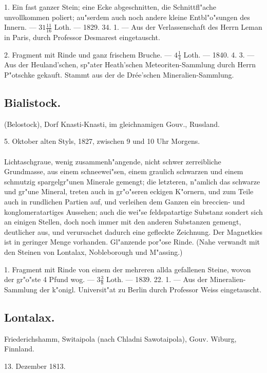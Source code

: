 \documentclass[a4paper, 11pt, oneside, polutonikogreek, german]{article}
\begin{document}
1. Ein fast ganzer Stein; eine Ecke abgeschnitten, die Schnittfl"ache unvollkommen poliert; au"serdem auch noch andere kleine Entbl"o"sungen des Innern. --- $31\frac{11}{16}$ Loth. --- 1829. 34. 1. --- Aus der Verlassenschaft des Herrn Leman in Paris, durch Professor Desmarest eingetauscht.

2. Fragment mit Rinde und ganz frischem Bruche. --- $4\frac{1}{4}$ Loth. --- 1840. 4. 3. --- Aus der Heuland'schen, sp"ater Heath'schen Meteoriten-Sammlung durch Herrn P"otschke gekauft. Stammt aus der de Drée'schen Mineralien-Sammlung.
\subsection{Bialistock.}
\begin{center}
\small
(Belostock), Dorf Knasti-Knasti, im gleichnamigen Gouv., Russland.

5. Oktober alten Styls, 1827, zwischen 9 und 10 Uhr Morgens.
\end{center}
\paragraph{}
Lichtaschgraue, wenig zusammenh"angende, nicht schwer zerreibliche Grundmasse, aus einem schneewei"sen, einem graulich schwarzen und einem schmutzig spargelgr"unen Minerale gemengt; die letzteren, n"amlich das schwarze und gr"une Mineral, treten auch in gr"o"seren eckigen K"ornern, und zum Teile auch in rundlichen Partien auf, und verleihen dem Ganzen ein breccien- und konglomeratartiges Aussehen; auch die wei"se feldspatartige Substanz sondert sich an einigen Stellen, doch noch immer mit den anderen Substanzen gemengt, deutlicher aus, und verursachet dadurch eine gefleckte Zeichnung. Der Magnetkies ist in geringer Menge vorhanden. Gl"anzende por"ose Rinde. (Nahe verwandt mit den Steinen von Lontalax, Nobleborough und M"assing.)

1. Fragment mit Rinde von einem der mehreren allda gefallenen Steine, wovon der gr"o"ste 4 Pfund wog. --- $3\frac{3}{8}$ Loth. --- 1839. 22. 1. --- Aus der Mineralien-Sammlung der k"onigl. Universit"at zu Berlin durch Professor Weiss eingetauscht.
\subsection{Lontalax.}
\begin{center}
\small
Friederichshamm, Switaipola (nach Chladni Sawotaipola), Gouv. Wiburg, Finnland.

13. Dezember 1813.
\end{center}
\end{document}
